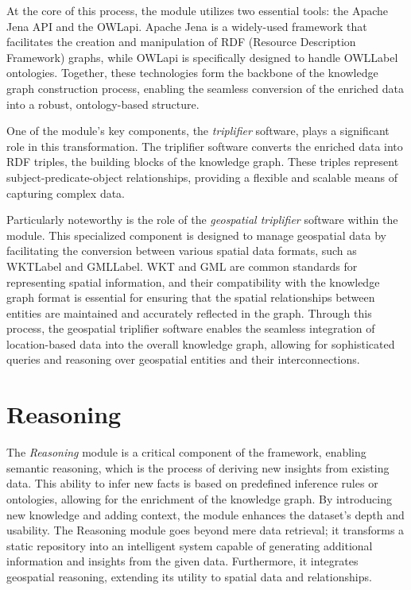 At the core of this process, the module utilizes two essential tools: the Apache Jena API\cite{ApacheJenaFramework} and the OWLapi\cite{OwlcsOwlapi2024}. Apache Jena is a widely-used framework that facilitates the creation and manipulation of RDF (Resource Description Framework) graphs, while OWLapi is specifically designed to handle \acrshort{OWLLabel} ontologies. Together, these technologies form the backbone of the knowledge graph construction process, enabling the seamless conversion of the enriched data into a robust, ontology-based structure.

One of the module's key components, the \textit{triplifier} software, plays a significant role in this transformation. The triplifier software converts the enriched data into RDF triples, the building blocks of the knowledge graph. These triples represent subject-predicate-object relationships, providing a flexible and scalable means of capturing complex data. 

Particularly noteworthy is the role of the \textit{geospatial triplifier} software within the module. This specialized component is designed to manage geospatial data by facilitating the conversion between various spatial data formats, such as \acrfull{WKTLabel}\cite{WellknownTextRepresentationa} and \acrfull{GMLLabel}\cite{GeographyMarkupLanguagea}. WKT and GML are common standards for representing spatial information, and their compatibility with the knowledge graph format is essential for ensuring that the spatial relationships between entities are maintained and accurately reflected in the graph. Through this process, the geospatial triplifier software enables the seamless integration of location-based data into the overall knowledge graph, allowing for sophisticated queries and reasoning over geospatial entities and their interconnections.

\section{Reasoning}\label{VI-sec:reasoning}

The \textit{Reasoning} module is a critical component of the framework, enabling semantic reasoning, which is the process of deriving new insights from existing data. This ability to infer new facts is based on predefined inference rules or ontologies, allowing for the enrichment of the knowledge graph. By introducing new knowledge and adding context, the module enhances the dataset’s depth and usability. The Reasoning module goes beyond mere data retrieval; it transforms a static repository into an intelligent system capable of generating additional information and insights from the given data. Furthermore, it integrates geospatial reasoning, extending its utility to spatial data and relationships.

